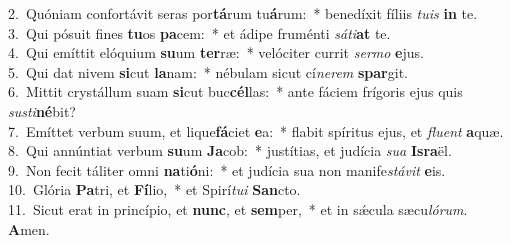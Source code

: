{2.~}Quóniam confortávit seras por\textbf{tá}rum tu\textbf{á}rum:~* benedíxit fíliis \textit{tu}\textit{is} \textbf{in} te.\\
{3.~}Qui pósuit fines \textbf{tu}os \textbf{pa}cem:~* et ádipe fruménti \textit{sá}\textit{ti}\textbf{at} te.\\
{4.~}Qui emíttit elóquium \textbf{su}um \textbf{ter}ræ:~* velóciter currit \textit{ser}\textit{mo} \textbf{e}jus.\\
{5.~}Qui dat nivem \textbf{si}cut \textbf{la}nam:~* nébulam sicut cí\textit{ne}\textit{rem} \textbf{spar}git.\\
{6.~}Mittit crystállum suam \textbf{si}cut buc\textbf{cél}las:~* ante fáciem frígoris ejus quis \textit{su}\textit{sti}\textbf{né}bit?\\
{7.~}Emíttet verbum suum, et lique\textbf{fá}ciet \textbf{e}a:~* flabit spíritus ejus, et \textit{flu}\textit{ent} \textbf{a}quæ.\\
{8.~}Qui annúntiat verbum \textbf{su}um \textbf{Ja}cob:~* justítias, et judícia \textit{su}\textit{a} \textbf{Is}\textbf{ra}ël.\\
{9.~}Non fecit táliter omni \textbf{na}ti\textbf{ó}ni:~* et judícia sua non manife\textit{stá}\textit{vit} \textbf{e}is.\\
{10.~}Glória \textbf{Pa}tri, et \textbf{Fí}lio,~* et Spirí\textit{tu}\textit{i} \textbf{San}cto.\\
{11.~}Sicut erat in princípio, et \textbf{nunc}, et \textbf{sem}per,~* et in sǽcula sæcu\textit{ló}\textit{rum}. \textbf{A}men.\\
